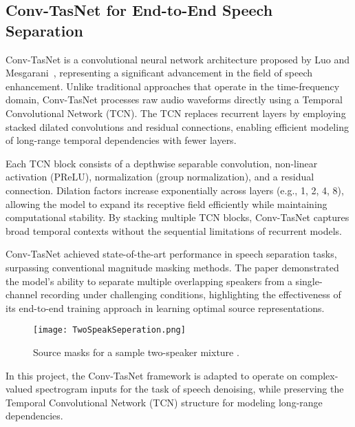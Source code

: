 \subsection{Conv-TasNet for End-to-End Speech Separation}
\label{sec:convtasnet_lit_review}

Conv-TasNet is a convolutional neural network architecture proposed by Luo and Mesgarani~\cite{luo2019conv}, representing a significant advancement in the field of speech enhancement. Unlike traditional approaches that operate in the time-frequency domain, Conv-TasNet processes raw audio waveforms directly using a Temporal Convolutional Network (TCN). The TCN replaces recurrent layers by employing stacked dilated convolutions and residual connections, enabling efficient modeling of long-range temporal dependencies with fewer layers.

Each TCN block consists of a depthwise separable convolution, non-linear activation (PReLU), normalization (group normalization), and a residual connection. Dilation factors increase exponentially across layers (e.g., 1, 2, 4, 8), allowing the model to expand its receptive field efficiently while maintaining computational stability. By stacking multiple TCN blocks, Conv-TasNet captures broad temporal contexts without the sequential limitations of recurrent models.

Conv-TasNet achieved state-of-the-art performance in speech separation tasks, surpassing conventional magnitude masking methods. The paper demonstrated the model's ability to separate multiple overlapping speakers from a single-channel recording under challenging conditions, highlighting the effectiveness of its end-to-end training approach in learning optimal source representations.

\begin{figure}[H]
    \centering
    \texttt{[image: TwoSpeakSeperation.png]}
    \caption{Source masks for a sample two-speaker mixture \cite{luo2019conv}.}
    \label{fig:convtasnet}
\end{figure}

In this project, the Conv-TasNet framework is adapted to operate on complex-valued spectrogram inputs for the task of speech denoising, while preserving the Temporal Convolutional Network (TCN) structure for modeling long-range dependencies.
